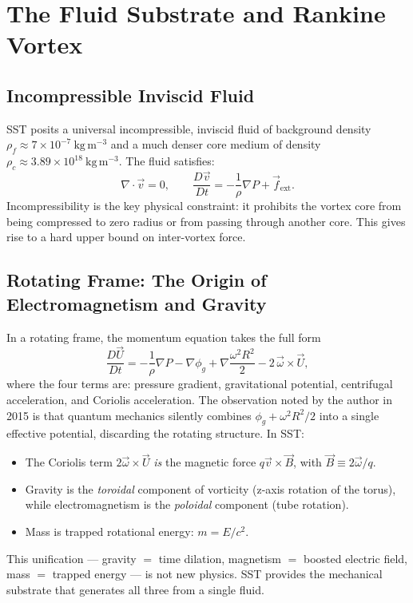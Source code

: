 \documentclass[11pt,a4paper]{article}
\begin{document}
\section{The Fluid Substrate and Rankine Vortex}\label{sec:substrate}

\subsection{Incompressible Inviscid Fluid}

SST posits a universal incompressible, inviscid fluid of background density
$\rho_f \approx 7\times10^{-7}\ \mathrm{kg\,m^{-3}}$ and a much denser core
medium of density $\rho_c \approx 3.89\times10^{18}\ \mathrm{kg\,m^{-3}}$.
The fluid satisfies:
\[
  \nabla \cdot \vec{v} = 0, \qquad
  \frac{D\vec{v}}{Dt} = -\frac{1}{\rho}\nabla P + \vec{f}_\text{ext}.
\]
Incompressibility is the key physical constraint: it prohibits the vortex core from
being compressed to zero radius or from passing through another core. This gives
rise to a hard upper bound on inter-vortex force.

\subsection{Rotating Frame: The Origin of Electromagnetism and Gravity}

In a rotating frame, the momentum equation takes the full form
\[
  \frac{D\vec{U}}{Dt}
  = -\frac{1}{\rho}\nabla P
  - \nabla\phi_g
  + \nabla\frac{\omega^2 R^2}{2}
  - 2\,\vec{\omega}\times\vec{U},
\]
where the four terms are: pressure gradient, gravitational potential, centrifugal
acceleration, and Coriolis acceleration. The observation noted by the author in 2015
\cite{Iskandarani2015Notes} is that quantum mechanics silently combines
$\phi_g + \omega^2 R^2/2$ into a single effective potential, discarding the rotating
structure. In SST:
\begin{itemize}
  \item The Coriolis term $2\vec{\omega}\times\vec{U}$ \emph{is} the magnetic force
        $q\vec{v}\times\vec{B}$, with $\vec{B} \equiv 2\vec{\omega}/q$.
  \item Gravity is the \emph{toroidal} component of vorticity (z-axis rotation of the
        torus), while electromagnetism is the \emph{poloidal} component (tube rotation).
  \item Mass is trapped rotational energy: $m = E/c^2$.
\end{itemize}
This unification --- gravity $=$ time dilation, magnetism $=$ boosted electric field,
mass $=$ trapped energy --- is not new physics. SST provides the mechanical substrate
that generates all three from a single fluid.
\end{document}
